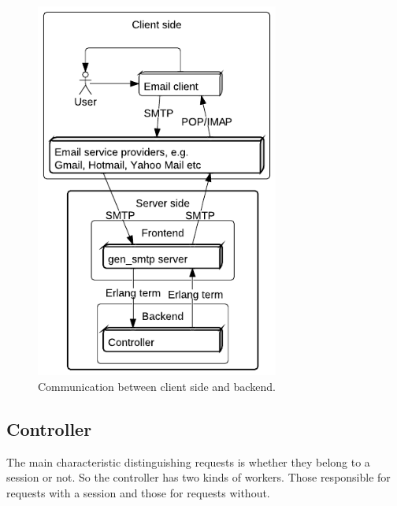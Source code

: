 \documentclass[11pt,a4paper]{report}
\begin{document}
\begin{figure}[h]
 \centering
 \includegraphics[width=8cm]{./graphics/smtp_arch.pdf}
 \caption{Communication between client side and backend.}
 \label{fig:smtp_arch}
\end{figure}

\subsection{Controller}
The main characteristic distinguishing requests is whether they belong to a
session or not.
So the controller has two kinds of workers.
Those responsible for requests with a session and those for requests without.
\end{document}
